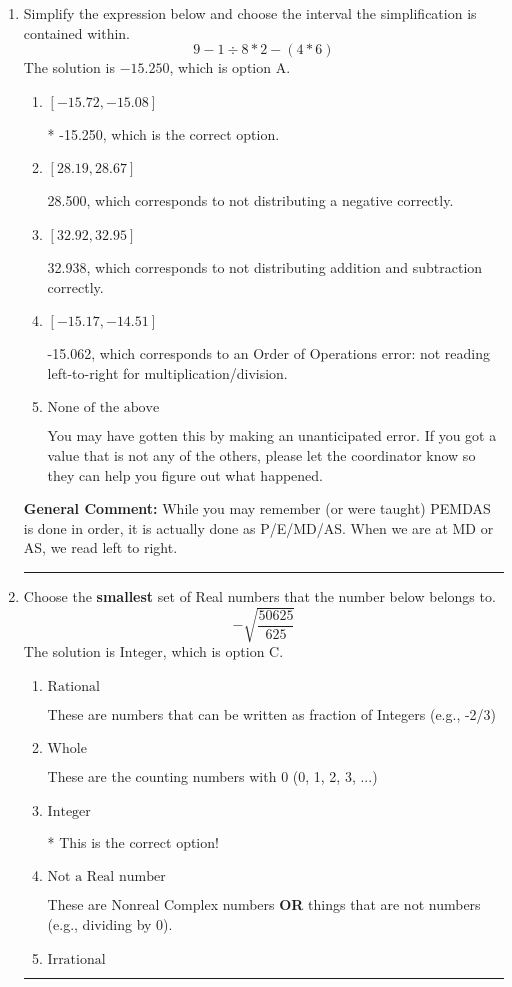 \documentclass{extbook}[14pt]
\newcommand{\litem}[1]{\item #1

\rule{\textwidth}{0.4pt}}
\begin{document}
\begin{enumerate}
{ Irrational numbers are more than just square root of 3: adding or subtracting values from square root of 3 is also irrational.
}
\litem{
Simplify the expression below and choose the interval the simplification is contained within.
\[ 9 - 1 \div 8 * 2 - (4 * 6) \]The solution is \( -15.250 \), which is option A.\begin{enumerate}[label=\Alph*.]
\item \( [-15.72, -15.08] \)

* -15.250, which is the correct option.
\item \( [28.19, 28.67] \)

 28.500, which corresponds to not distributing a negative correctly.
\item \( [32.92, 32.95] \)

 32.938, which corresponds to not distributing addition and subtraction correctly.
\item \( [-15.17, -14.51] \)

 -15.062, which corresponds to an Order of Operations error: not reading left-to-right for multiplication/division.
\item \( \text{None of the above} \)

 You may have gotten this by making an unanticipated error. If you got a value that is not any of the others, please let the coordinator know so they can help you figure out what happened.
\end{enumerate}

\textbf{General Comment:} While you may remember (or were taught) PEMDAS is done in order, it is actually done as P/E/MD/AS. When we are at MD or AS, we read left to right.
}
\litem{
Choose the \textbf{smallest} set of Real numbers that the number below belongs to.
\[ -\sqrt{\frac{50625}{625}} \]The solution is \( \text{Integer} \), which is option C.\begin{enumerate}[label=\Alph*.]
\item \( \text{Rational} \)

These are numbers that can be written as fraction of Integers (e.g., -2/3)
\item \( \text{Whole} \)

These are the counting numbers with 0 (0, 1, 2, 3, ...)
\item \( \text{Integer} \)

* This is the correct option!
\item \( \text{Not a Real number} \)

These are Nonreal Complex numbers \textbf{OR} things that are not numbers (e.g., dividing by 0).
\item \( \text{Irrational} \)


\end{enumerate}}
\end{enumerate}
\end{document}
